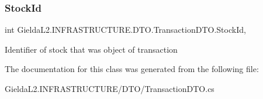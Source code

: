 \subsubsection{\texorpdfstring{StockId}{StockId}}
{\footnotesize\ttfamily int Gielda\+L2.\+I\+N\+F\+R\+A\+S\+T\+R\+U\+C\+T\+U\+R\+E.\+D\+T\+O.\+Transaction\+D\+T\+O.\+Stock\+Id\hspace{0.3cm}{\ttfamily [get]}, {\ttfamily [set]}}



Identifier of stock that was object of transaction 



The documentation for this class was generated from the following file\+:\begin{DoxyCompactItemize}
\item 
Gielda\+L2.\+I\+N\+F\+R\+A\+S\+T\+R\+U\+C\+T\+U\+R\+E/\+D\+T\+O/Transaction\+D\+T\+O.\+cs\end{DoxyCompactItemize}
